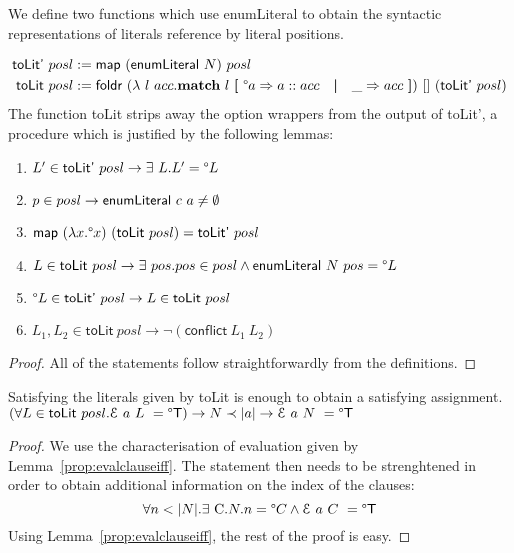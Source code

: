 \documentclass[a4paper,UKenglish,cleveref, autoref]{lipics-v2019}
\begin{document}
We define two functions which use \textsf{enumLiteral} to obtain the syntactic representations of literals reference by literal positions.

\begin{align*}
  \textsf{toLit'}~posl &:= \textsf{map}~(\textsf{enumLiteral}~N)~posl \\
  \textsf{toLit}~posl &:= \textsf{foldr}~(\lambda~l~acc. \textbf{match}~ l ~\textbf{[}~ \degree a \Rightarrow a :: acc \quad\textbf{|}\quad \_ \Rightarrow acc ~\textbf{]})~[]~(\textsf{toLit'}~posl) 
\end{align*}
The function \textsf{toLit} strips away the option wrappers from the output of \textsf{toLit'}, a procedure which is justified by the following lemmas:

\begin{lemma}\leavevmode
  \begin{enumerate}
    \item $L' \in \textsf{toLit'}~posl \rightarrow \exists~L. L' = \degree L$
    \item $p \in posl \rightarrow \textsf{enumLiteral}~c~a \neq \emptyset$
    \item $\textsf{map}~(\lambda x. \degree x)~(\textsf{toLit}~posl) = \textsf{toLit'}~posl$
    \item $L \in \textsf{toLit}~posl \rightarrow \exists~pos. pos \in posl \land \textsf{enumLiteral}~N~pos = \degree L$
    \item $\degree L \in \textsf{toLit'}~posl \rightarrow L \in \textsf{toLit}~posl$
    \item $L_1, L_2 \in \textsf{toLit}~posl \rightarrow \lnot (\textsf{conflict}~L_1~L_2)$
  \end{enumerate}
\end{lemma}
\begin{proof}
  All of the statements follow straightforwardly from the definitions.
\end{proof}

\begin{lemma} Satisfying the literals given by \textsf{toLit} is enough to obtain a satisfying assignment.
  $(\forall L \in \textsf{toLit}~posl. \mathcal{E}~a~L~ = \degree\mathsf{T}) \rightarrow N \prec |a| \rightarrow \mathcal{E}~a~N~ = \degree\mathsf{T}$
\end{lemma}
\begin{proof}
  We use the characterisation of evaluation given by Lemma~\ref{prop:evalclauseiff}. 
  The statement then needs to be strenghtened in order to obtain additional information on the index of the clauses:
  \[\forall n < \length{N}. \exists~$C$. N.n = \Some{C} \land \eval{a}{C} = \Some{\btrue} \]
  Using Lemma~\ref{prop:evalclauseiff}, the rest of the proof is easy.
\end{proof}
\end{document}
